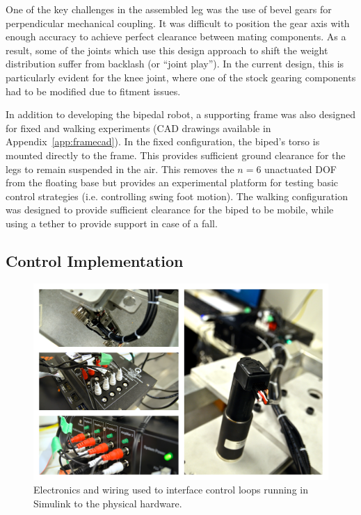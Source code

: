 One of the key challenges in the assembled leg was the use of bevel gears for perpendicular mechanical coupling. It was difficult to position the gear axis with enough accuracy to achieve perfect clearance between mating components. As a result, some of the joints which use this design approach to shift the weight distribution suffer from backlash (or ``joint play''). In the current design, this is particularly evident for the knee joint, where one of the stock gearing components had to be modified due to fitment issues. 

In addition to developing the bipedal robot, a supporting frame was also designed for fixed and walking experiments (CAD drawings available in Appendix~\ref{app:framecad}). In the fixed configuration, the biped's torso is mounted directly to the frame. This provides sufficient ground clearance for the legs to remain suspended in the air. This removes the $n = 6$ unactuated DOF from the floating base but provides an experimental platform for testing basic control strategies (i.e. controlling swing foot motion). The walking configuration was designed to provide sufficient clearance for the biped to be mobile, while using a tether to provide support in case of a fall. 

\subsection{Control Implementation} %
\label{sub:control_implementation}

\begin{figure}[!b]
	\centering
    \includegraphics[scale=0.39]{fig/hardware/bipedwired.png} 
  	\caption{Electronics and wiring used to interface control loops running in Simulink to the physical hardware.}
	\label{fig:bipedwired}
\end{figure}

